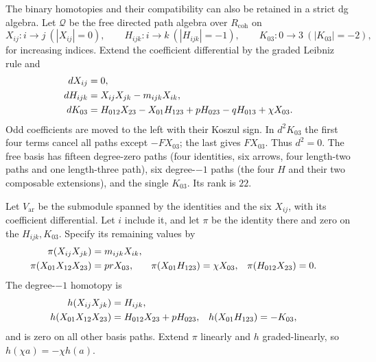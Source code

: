 The binary homotopies and their compatibility can also be
retained in a strict dg algebra. Let $\mathcal Q$ be the
free directed path algebra over $R_{\mathrm{coh}}$ on
\[
 X_{ij}:i\to j\ (|X_{ij}|=0),\qquad
 H_{ijk}:i\to k\ (|H_{ijk}|=-1),\qquad
 K_{03}:0\to3\ (|K_{03}|=-2),
\]
for increasing indices. Extend the coefficient differential
by the graded Leibniz rule and
\begin{align}\label{eq:vol2-four-resolution}
 dX_{ij}&=0,\notag\\
 dH_{ijk}&=X_{ij}X_{jk}-m_{ijk}X_{ik},\notag\\
 dK_{03}&=H_{012}X_{23}-X_{01}H_{123}
                 +pH_{023}-qH_{013}+\chi X_{03}.
\end{align}
Odd coefficients are moved to the left with their Koszul sign.
In $d^2K_{03}$ the first four terms cancel all paths except
$-FX_{03}$; the last gives $FX_{03}$. Thus $d^2=0$.
The free basis has fifteen degree-zero paths (four identities,
six arrows, four length-two paths and one length-three path),
six degree-$-1$ paths (the four $H$ and their two composable
extensions), and the single $K_{03}$. Its rank is $22$.

Let $V_{\mathrm{ar}}$ be the submodule spanned by the identities
and the six $X_{ij}$, with its coefficient differential.
Let $i$ include it, and let $\pi$ be the identity there and
zero on the $H_{ijk},K_{03}$. Specify its remaining values by
\begin{align}\label{eq:vol2-four-projection}
 \pi(X_{ij}X_{jk})&=m_{ijk}X_{ik},\notag\\
 \pi(X_{01}X_{12}X_{23})&=prX_{03},&
 \pi(X_{01}H_{123})&=\chi X_{03},&
 \pi(H_{012}X_{23})&=0.
\end{align}
The degree-$-1$ homotopy is
\begin{align}\label{eq:vol2-four-homotopy}
 h(X_{ij}X_{jk})&=H_{ijk},\notag\\
 h(X_{01}X_{12}X_{23})&=H_{012}X_{23}+pH_{023},&
 h(X_{01}H_{123})&=-K_{03},
\end{align}
and is zero on all other basis paths. Extend $\pi$ linearly
and $h$ graded-linearly, so $h(\chi a)=-\chi h(a)$.

